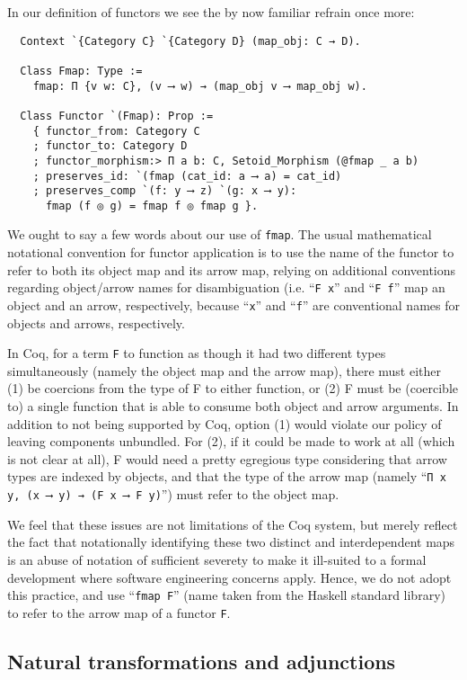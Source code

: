 \documentclass[a4paper,10pt,runningheads]{llncs}
\begin{document}
In our definition of functors we see the by now familiar refrain once more:
\begin{lstlisting}
  Context `{Category C} `{Category D} (map_obj: C → D).

  Class Fmap: Type :=
    fmap: Π {v w: C}, (v ⟶ w) → (map_obj v ⟶ map_obj w).

  Class Functor `(Fmap): Prop :=
    { functor_from: Category C
    ; functor_to: Category D
    ; functor_morphism:> Π a b: C, Setoid_Morphism (@fmap _ a b)
    ; preserves_id: `(fmap (cat_id: a ⟶ a) = cat_id)
    ; preserves_comp `(f: y ⟶ z) `(g: x ⟶ y):
      fmap (f ◎ g) = fmap f ◎ fmap g }.
\end{lstlisting}
We ought to say a few words about our use of \lstinline|fmap|. The usual mathematical notational convention for functor application is to use the name of the functor to refer to both its object map and its arrow map, relying on additional conventions regarding object/arrow names for disambiguation (i.e. ``\lstinline|F x|'' and ``\lstinline|F f|'' map an object and an arrow, respectively, because ``\lstinline|x|'' and ``\lstinline|f|'' are conventional names for objects and arrows, respectively.

In Coq, for a term \lstinline|F| to function as though it had two different types simultaneously (namely the object map and the arrow map), there must either (1) be coercions from the type of F to either function, or (2) F must be (coercible to) a single function that is able to consume both object and arrow arguments. In addition to not being supported by Coq, option (1) would violate our policy of leaving components unbundled. For (2), if it could be made to work at all (which is not clear at all), F would need a pretty egregious type considering that arrow types are indexed by objects, and that the type of the arrow map (namely ``\lstinline|Π x y, (x ⟶ y) → (F x ⟶ F y)|'') must refer to the object map.

We feel that these issues are not limitations of the Coq system, but merely reflect the fact that notationally identifying these two distinct and interdependent maps is an abuse of notation of sufficient severety to make it ill-suited to a formal development where software engineering concerns apply. Hence, we do not adopt this practice, and use ``\lstinline|fmap F|'' (name taken from the Haskell standard library) to refer to the arrow map of a functor \lstinline|F|.

\subsection{Natural transformations and adjunctions}
\end{document}
